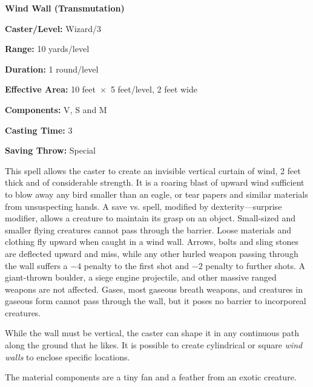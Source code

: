 \begin{multicols}{2}
\columnbreak

\vspace{1em}

\noindent
\begin{minipage}{\columnwidth}

\noindent \textbf{Wind Wall (Transmutation)}

\noindent \textbf{Caster/Level:} Wizard/3

\noindent \textbf{Range:} 10 yards/level

\noindent \textbf{Duration:} 1 round/level

\noindent \textbf{Effective Area:} 10 feet~$\times$~5 feet/level, 2 feet wide

\noindent \textbf{Components:} V, S and M

\noindent \textbf{Casting Time:} 3

\noindent \textbf{Saving Throw:} Special

\end{minipage}

This spell allows the caster to create an invisible vertical curtain of wind, 2 feet thick and of considerable strength.  It is a roaring blast of upward wind sufficient to blow away any bird smaller than an eagle, or tear papers and similar materials from unsuspecting hands.  A save vs. spell, modified by dexterity---surprise modifier, allows a creature to maintain its grasp on an object.  Small-sized and smaller flying creatures cannot pass through the barrier.  Loose materials and clothing fly upward when caught in a wind wall.  Arrows, bolts and sling stones are deflected upward and miss, while any other hurled weapon passing through the wall suffers a $-4$ penalty to the first shot and $-2$ penalty to further shots.  A giant-thrown boulder, a siege engine projectile, and other massive ranged weapons are not affected.  Gases, most gaseous breath weapons, and creatures in gaseous form cannot pass through the wall, but it poses no barrier to incorporeal creatures. 

While the wall must be vertical, the caster can shape it in any continuous path along the ground that he likes.  It is possible to create cylindrical or square \textit{wind walls} to enclose specific locations.

The material components are a tiny fan and a feather from an exotic creature.

\vspace{1em}

\noindent
\begin{minipage}{\columnwidth}


\end{minipage}
\end{multicols}
